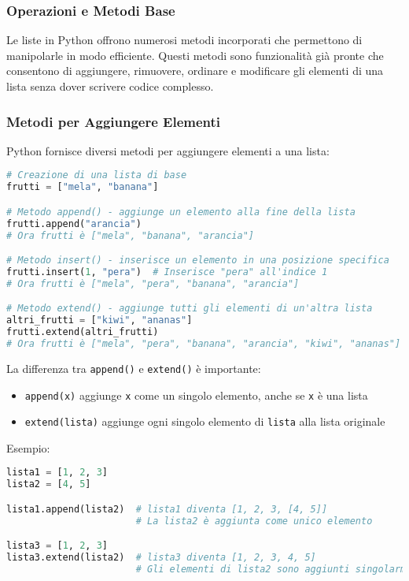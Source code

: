 \clearpage

\subsubsection{Operazioni e Metodi Base}

Le liste in Python offrono numerosi metodi incorporati che permettono di manipolarle in modo efficiente. Questi metodi sono funzionalità già pronte che consentono di aggiungere, rimuovere, ordinare e modificare gli elementi di una lista senza dover scrivere codice complesso.

\subsubsection{Metodi per Aggiungere Elementi}\label{MetodiListe}

Python fornisce diversi metodi per aggiungere elementi a una lista:

\begin{lstlisting}[language=Python]
# Creazione di una lista di base
frutti = ["mela", "banana"]

# Metodo append() - aggiunge un elemento alla fine della lista
frutti.append("arancia")
# Ora frutti è ["mela", "banana", "arancia"]

# Metodo insert() - inserisce un elemento in una posizione specifica
frutti.insert(1, "pera")  # Inserisce "pera" all'indice 1
# Ora frutti è ["mela", "pera", "banana", "arancia"]

# Metodo extend() - aggiunge tutti gli elementi di un'altra lista
altri_frutti = ["kiwi", "ananas"]
frutti.extend(altri_frutti)
# Ora frutti è ["mela", "pera", "banana", "arancia", "kiwi", "ananas"]
\end{lstlisting}

La differenza tra \texttt{append()} e \texttt{extend()} è importante:
\begin{itemize}
    \item \texttt{append(x)} aggiunge \texttt{x} come un singolo elemento, anche se \texttt{x} è una lista
    \item \texttt{extend(lista)} aggiunge ogni singolo elemento di \texttt{lista} alla lista originale
\end{itemize}

Esempio:
\begin{lstlisting}[language=Python]
lista1 = [1, 2, 3]
lista2 = [4, 5]

lista1.append(lista2)  # lista1 diventa [1, 2, 3, [4, 5]]
                       # La lista2 è aggiunta come unico elemento

lista3 = [1, 2, 3]
lista3.extend(lista2)  # lista3 diventa [1, 2, 3, 4, 5]
                       # Gli elementi di lista2 sono aggiunti singolarmente
\end{lstlisting}

